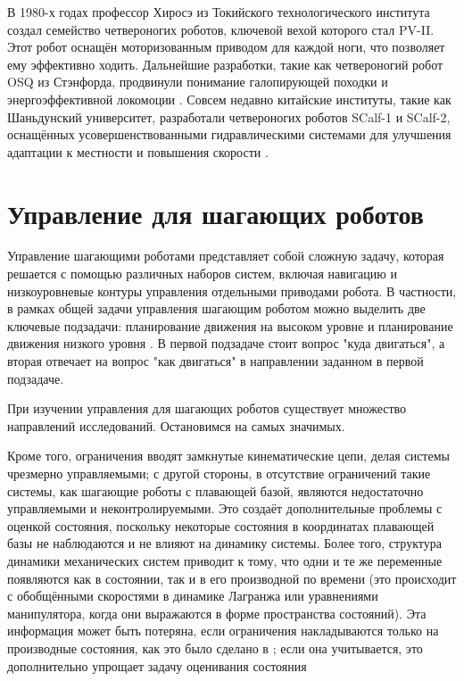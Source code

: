 В 1980-х годах профессор Хиросэ из Токийского технологического института создал семейство четвероногих роботов, ключевой вехой которого стал PV-II. Этот робот оснащён моторизованным приводом для каждой ноги, что позволяет ему эффективно ходить\cite{Hirose2009}. Дальнейшие разработки, такие как четвероногий робот OSQ из Стэнфорда, продвинули понимание галопирующей походки и энергоэффективной локомоции \cite{Nichol2004}.  Совсем недавно китайские институты, такие как Шаньдунский университет, разработали четвероногих роботов SCalf-1 и SCalf-2, оснащённых усовершенствованными гидравлическими системами для улучшения адаптации к местности и повышения скорости \cite{Rong2012}.

\section{Управление для шагающих роботов}\label{sec:ch1/sec2}
Управление шагающими роботами представляет собой сложную задачу, которая решается с помощью различных наборов систем, включая навигацию и низкоуровневые контуры управления отдельными приводами робота. В частности, в рамках общей задачи управления шагающим роботом можно выделить две ключевые подзадачи: планирование движения на высоком уровне и планирование движения низкого уровня \cite{WalkingRobots}. В первой подзадаче стоит вопрос "куда двигаться", а вторая отвечает на вопрос "как двигаться" в направлении заданном в первой подзадаче.

При изучении управления для шагающих роботов существует множество направлений исследований. Остановимся на самых значимых.


Кроме того, ограничения вводят замкнутые кинематические цепи, делая системы чрезмерно управляемыми; с другой стороны, в отсутствие ограничений такие системы, как шагающие роботы с плавающей базой, являются недостаточно управляемыми и неконтролируемыми. Это создаёт дополнительные проблемы с оценкой состояния, поскольку некоторые состояния в координатах плавающей базы не наблюдаются и не влияют на динамику системы. Более того, структура динамики механических систем приводит к тому, что одни и те же переменные появляются как в состоянии, так и в его производной по времени (это происходит с обобщёнными скоростями в динамике Лагранжа или уравнениями манипулятора, когда они выражаются в форме пространства состояний). Эта информация может быть потеряна, если ограничения накладываются только на производные состояния, как это было сделано в \cite{Mason2017}; если она учитывается, это дополнительно упрощает задачу оценивания состояния

